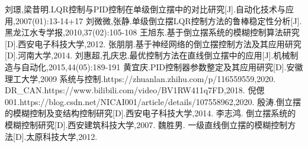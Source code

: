 \documentclass[degree=master,bibtype=numeric]{tongjithesis}
\begin{document}
\graphicspath{{figures/}}


\frontmatter

\makecover


\tableofcontents
%


\mainmatter



\backmatter

\begin{acknowledgement}

\end{acknowledgement}

    \newpage


	\begin{thebibliography}{99}
	刘璟,梁昔明.LQR控制与PID控制在单级倒立摆中的对比研究[J].自动化技术与应用,2007(01):13-14+17
	刘微微,张静.单级倒立摆LQR控制方法的鲁棒稳定性分析[J].黑龙江水专学报,2010,37(02):105-108
	王旭东.基于倒立摆系统的模糊控制算法研究[D].西安电子科技大学,2012.
	张朋朋.基于神经网络的倒立摆控制方法及其应用研究[D].河南大学,2014.
	刘惠超,孔庆忠.最优控制方法在直线倒立摆中的应用[J].机械制造与自动化,2015,44(05):189-191
	黄宜庆.PID控制器参数整定及其应用研究[D].安徽理工大学,2009
	系统与控制.https://zhuanlan.zhihu.com/p/116559559,2020.  %
	DR\_CAN.https://www.bilibili.com/video/BV1RW411q7FD,2018.  %
	倪偲001.https://blog.csdn.net/NICAI001/article/details/107558962,2020. %
	殷涛.倒立摆的模糊控制及变结构控制研究[D].西安电子科技大学,2014.
    李志鸿. 倒立摆系统的模糊控制研究[D].西安建筑科技大学,2007.
    魏胜男. 一级直线倒立摆的模糊控制方法[D].太原科技大学,2012.
	\end{thebibliography}


\begin{appendix}

\end{appendix}

%
\end{document}
